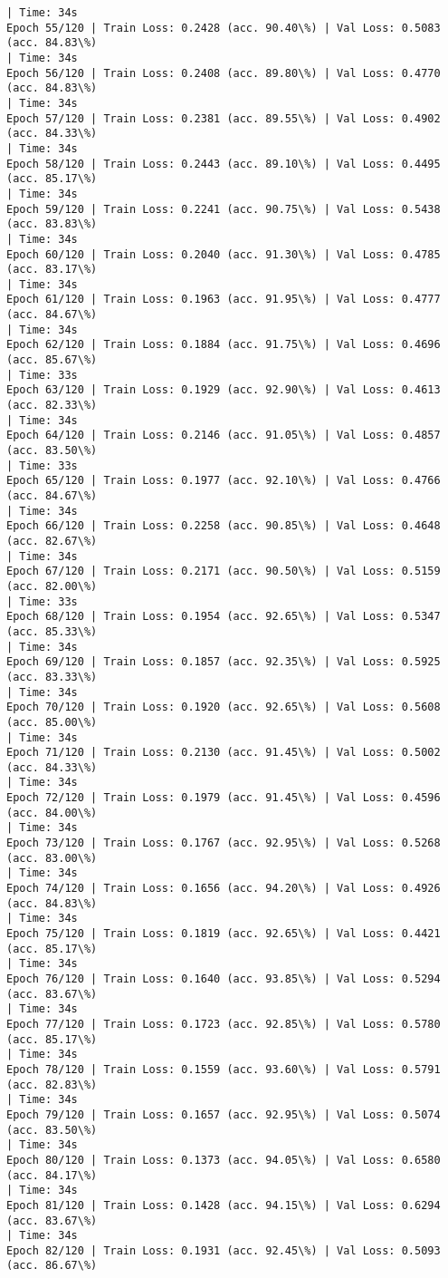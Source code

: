 \documentclass[8pt]{extarticle}
\begin{document}
\begin{Verbatim}[commandchars=\\\{\}]
| Time: 34s
Epoch 55/120 | Train Loss: 0.2428 (acc. 90.40\%) | Val Loss: 0.5083 (acc. 84.83\%)
| Time: 34s
Epoch 56/120 | Train Loss: 0.2408 (acc. 89.80\%) | Val Loss: 0.4770 (acc. 84.83\%)
| Time: 34s
Epoch 57/120 | Train Loss: 0.2381 (acc. 89.55\%) | Val Loss: 0.4902 (acc. 84.33\%)
| Time: 34s
Epoch 58/120 | Train Loss: 0.2443 (acc. 89.10\%) | Val Loss: 0.4495 (acc. 85.17\%)
| Time: 34s
Epoch 59/120 | Train Loss: 0.2241 (acc. 90.75\%) | Val Loss: 0.5438 (acc. 83.83\%)
| Time: 34s
Epoch 60/120 | Train Loss: 0.2040 (acc. 91.30\%) | Val Loss: 0.4785 (acc. 83.17\%)
| Time: 34s
Epoch 61/120 | Train Loss: 0.1963 (acc. 91.95\%) | Val Loss: 0.4777 (acc. 84.67\%)
| Time: 34s
Epoch 62/120 | Train Loss: 0.1884 (acc. 91.75\%) | Val Loss: 0.4696 (acc. 85.67\%)
| Time: 33s
Epoch 63/120 | Train Loss: 0.1929 (acc. 92.90\%) | Val Loss: 0.4613 (acc. 82.33\%)
| Time: 34s
Epoch 64/120 | Train Loss: 0.2146 (acc. 91.05\%) | Val Loss: 0.4857 (acc. 83.50\%)
| Time: 33s
Epoch 65/120 | Train Loss: 0.1977 (acc. 92.10\%) | Val Loss: 0.4766 (acc. 84.67\%)
| Time: 34s
Epoch 66/120 | Train Loss: 0.2258 (acc. 90.85\%) | Val Loss: 0.4648 (acc. 82.67\%)
| Time: 34s
Epoch 67/120 | Train Loss: 0.2171 (acc. 90.50\%) | Val Loss: 0.5159 (acc. 82.00\%)
| Time: 33s
Epoch 68/120 | Train Loss: 0.1954 (acc. 92.65\%) | Val Loss: 0.5347 (acc. 85.33\%)
| Time: 34s
Epoch 69/120 | Train Loss: 0.1857 (acc. 92.35\%) | Val Loss: 0.5925 (acc. 83.33\%)
| Time: 34s
Epoch 70/120 | Train Loss: 0.1920 (acc. 92.65\%) | Val Loss: 0.5608 (acc. 85.00\%)
| Time: 34s
Epoch 71/120 | Train Loss: 0.2130 (acc. 91.45\%) | Val Loss: 0.5002 (acc. 84.33\%)
| Time: 34s
Epoch 72/120 | Train Loss: 0.1979 (acc. 91.45\%) | Val Loss: 0.4596 (acc. 84.00\%)
| Time: 34s
Epoch 73/120 | Train Loss: 0.1767 (acc. 92.95\%) | Val Loss: 0.5268 (acc. 83.00\%)
| Time: 34s
Epoch 74/120 | Train Loss: 0.1656 (acc. 94.20\%) | Val Loss: 0.4926 (acc. 84.83\%)
| Time: 34s
Epoch 75/120 | Train Loss: 0.1819 (acc. 92.65\%) | Val Loss: 0.4421 (acc. 85.17\%)
| Time: 34s
Epoch 76/120 | Train Loss: 0.1640 (acc. 93.85\%) | Val Loss: 0.5294 (acc. 83.67\%)
| Time: 34s
Epoch 77/120 | Train Loss: 0.1723 (acc. 92.85\%) | Val Loss: 0.5780 (acc. 85.17\%)
| Time: 34s
Epoch 78/120 | Train Loss: 0.1559 (acc. 93.60\%) | Val Loss: 0.5791 (acc. 82.83\%)
| Time: 34s
Epoch 79/120 | Train Loss: 0.1657 (acc. 92.95\%) | Val Loss: 0.5074 (acc. 83.50\%)
| Time: 34s
Epoch 80/120 | Train Loss: 0.1373 (acc. 94.05\%) | Val Loss: 0.6580 (acc. 84.17\%)
| Time: 34s
Epoch 81/120 | Train Loss: 0.1428 (acc. 94.15\%) | Val Loss: 0.6294 (acc. 83.67\%)
| Time: 34s
Epoch 82/120 | Train Loss: 0.1931 (acc. 92.45\%) | Val Loss: 0.5093 (acc. 86.67\%)

\end{Verbatim}
\end{document}
